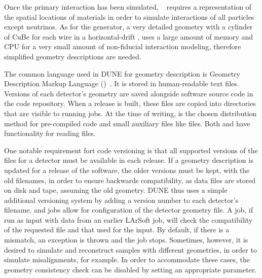 \documentclass[../main-v1.tex]{subfiles}
\begin{document}
Once the primary interaction has been simulated, ~\cite{geant4} requires a representation of the spatial locations of materials in order to simulate interactions of all particles except neutrinos.  As for the generator, a very detailed geometry with a cylinder of CuBe for each wire in a horizontal-drift , uses a large amount of memory and CPU for a very small amount of non-fiducial interaction modeling, therefore %
simplified geometry descriptions are needed.

The common language used in DUNE for geometry description is Geometry Description Markup Language ()~\cite{gdml}.  It is stored in human-readable text files.  Versions of each detector's geometry are saved alongside software source code in the code repository.  When a release is built, these  files are copied into directories that are visible to running jobs.  At the time of writing,  is the chosen distribution method for pre-compiled code and small auxiliary files like  files.   Both  and  have functionality for reading  files.

One notable 
requirement %
fort code versioning is that all supported versions of the  files for a detector must be available in each release.  If a geometry description is updated for a release of the software, the older versions must be kept, with the old  filenames, in order to ensure backwards compatibility, as data files are stored on disk and tape, assuming the old geometry.  DUNE thus uses a simple additional versioning system by adding a version number to each detector's  filename.   and   jobs allow for  configuration of the detector geometry  file.  A   job, if run as input with data from an earlier LArSoft job, will check the compatibility of the requested  file and that used for the input.  By default, if there is a mismatch, an exception is thrown and the job stops.  Sometimes, however, it is desired to simulate and reconstruct  samples with different geometries, in order to simulate misalignments, for example.  In order to accommodate these cases, the geometry consistency check can be disabled by setting an appropriate  parameter.
\end{document}
